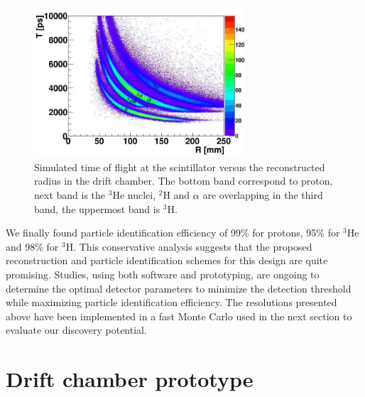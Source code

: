 \begin{figure}[ht!]
    \begin{center}
        \includegraphics[width=0.7\textwidth]{./../Detector/fig-chap2/Bare_3atm_1atm_RvsTime_named}
        \caption{Simulated time of flight at the scintillator versus the reconstructed radius in the drift chamber. The bottom band correspond to proton, next band is the $^3$He nuclei, $^2$H and $\alpha$ are overlapping in the third band, the uppermost band is $^3$H.\label{fig:SIMtof}}
    \end{center}
\end{figure}

We finally found particle identification efficiency of 99\% for protons, 95\% for $^3$He and 98\% for $^3$H. This conservative analysis suggests that the proposed reconstruction and particle identification schemes for this design are quite promising. Studies, using both software and prototyping, are ongoing to determine the optimal detector parameters to minimize the detection threshold while maximizing particle identification efficiency. The resolutions presented above have been implemented in a fast Monte Carlo used in the next section to evaluate our discovery potential.

\section{Drift chamber prototype}


